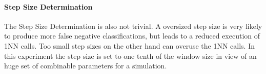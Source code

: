 \paragraph{Step Size Determination} \label{step_size_determination}
The Step Size Determination is also not trivial. A oversized step size is very likely to produce more false negative
classifications, but leads to a reduced execution of 1NN calls. Too small step sizes on the other hand can overuse the
1NN calls. In this experiment the step size is set to one tenth of the window size in view of an huge set of combinable
parameters for a simulation.
